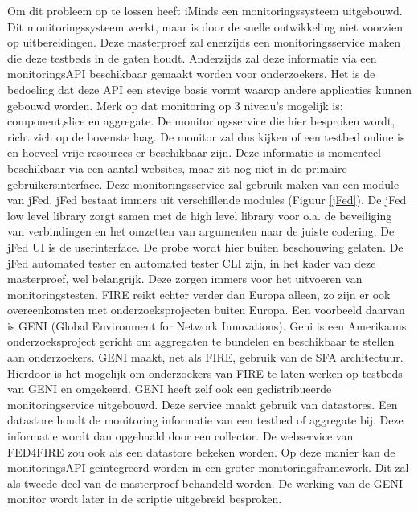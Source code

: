 \npar
Om dit probleem op te lossen heeft iMinds een monitoringssysteem uitgebouwd\citep{fed4fire-second-fed-arch}. Dit monitoringssysteem werkt, maar is door de snelle ontwikkeling niet voorzien op uitbereidingen. Deze masterproef zal enerzijds een monitoringsservice maken die deze testbeds in de gaten houdt. Anderzijds zal deze informatie via een monitoringsAPI beschikbaar gemaakt worden voor onderzoekers. Het is de bedoeling dat deze API een stevige basis vormt waarop andere applicaties kunnen gebouwd worden. Merk op dat monitoring op 3 niveau's mogelijk is: component,slice en aggregate. De monitoringsservice die hier besproken wordt, richt zich op de bovenste laag. De monitor zal dus kijken of een testbed online is en hoeveel vrije resources er beschikbaar zijn. Deze informatie is momenteel beschikbaar via een aantal websites, maar zit nog niet in de primaire gebruikersinterface.
\npar
Deze monitoringsservice zal gebruik maken van een module van jFed.
jFed bestaat immers uit verschillende modules (Figuur \ref{jFed}).
De jFed low level library zorgt samen met de high level library voor o.a. de beveiliging van verbindingen en het omzetten van argumenten naar de juiste codering. De jFed UI is de userinterface. De probe wordt hier buiten beschouwing gelaten. De jFed automated tester en automated tester CLI zijn, in het kader van deze masterproef, wel belangrijk. Deze zorgen immers voor het uitvoeren van monitoringstesten.
\clearpage
\npar
FIRE reikt echter verder dan Europa alleen, zo zijn er ook overeenkomsten met onderzoeksprojecten buiten Europa. Een voorbeeld daarvan is GENI (Global Environment for Network Innovations). Geni is een Amerikaans onderzoeksproject gericht om aggregaten te bundelen en beschikbaar te stellen aan onderzoekers\citep{geni-what-is}. GENI maakt, net als FIRE, gebruik van de SFA architectuur\citep{geni-sfa}. Hierdoor is het mogelijk om onderzoekers van FIRE te laten werken op testbeds van GENI en omgekeerd.
\npar
GENI heeft zelf ook een gedistribueerde monitoringservice uitgebouwd\citep{geni-monitor}. Deze service maakt gebruik van datastores\citep{geni-overview}. Een datastore houdt de monitoring informatie van een testbed of aggregate bij. Deze informatie wordt dan opgehaald door een collector. De webservice van FED4FIRE zou ook als een datastore bekeken worden. Op deze manier kan de monitoringsAPI geïntegreerd worden in een groter monitoringsframework. Dit zal als tweede deel van de masterproef behandeld worden. De werking van de GENI monitor wordt later in de scriptie uitgebreid besproken.